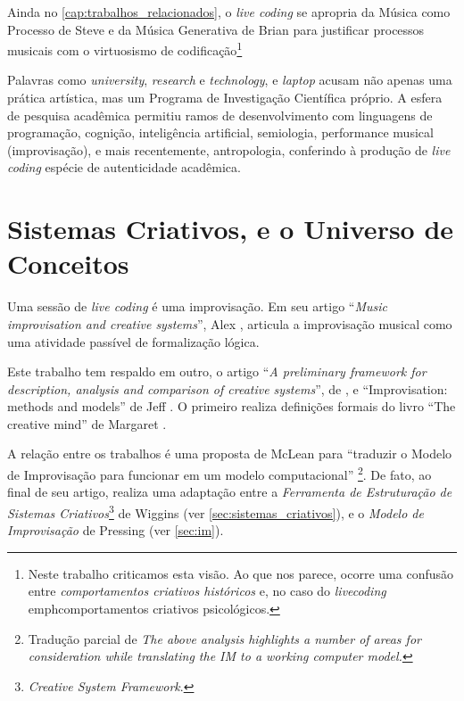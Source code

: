 Ainda no \autoref{cap:trabalhos_relacionados}, o \emph{live coding} se apropria da Música como Processo de Steve  e da Música Generativa de Brian  para justificar processos musicais com o virtuosismo de codificação\footnote{Neste trabalho criticamos esta visão. Ao que nos parece, ocorre uma confusão entre \emph{comportamentos criativos históricos} e, no caso do \emph{livecoding} emph{comportamentos criativos psicológicos}.}  

Palavras como \emph{university}, \emph{research} e \emph{technology}, e \emph{laptop} acusam não apenas uma prática artística, mas um Programa de Investigação Científica próprio. A esfera de pesquisa acadêmica permitiu ramos de desenvolvimento com linguagens de programação, cognição, inteligência artificial, semiologia, performance musical (improvisação), e mais recentemente, antropologia, conferindo à produção de \emph{live coding} espécie de autenticidade acadêmica.

\section{Sistemas Criativos, e o Universo de Conceitos}\label{sec:universo}

Uma sessão de \emph{live coding} é uma improvisação. Em seu artigo ``\emph{Music improvisation and creative systems}'', Alex ,  articula a improvisação musical como uma atividade passível de formalização lógica. 

Este trabalho tem respaldo em outro, o artigo ``\emph{A preliminary framework for description, analysis and comparison of creative systems}'', de , e ``Improvisation: methods and models'' de Jeff . O primeiro realiza definições formais do livro ``The creative mind'' de Margaret .

A relação entre os trabalhos é uma proposta de McLean para ``traduzir o Modelo de Improvisação para funcionar em um modelo computacional'' \cite[p.~5]{mclean_music_2006}\footnote{Tradução parcial de \emph{The above analysis highlights a number of areas for consideration while translating the IM to a working computer model.}}. De fato, ao final de seu artigo, realiza uma adaptação entre a \emph{Ferramenta de Estruturação de Sistemas Criativos}\footnote{\emph{Creative System Framework}.} de Wiggins (ver \autoref{sec:sistemas_criativos}), e o \emph{Modelo de Improvisação} de Pressing (ver \autoref{sec:im}). 

